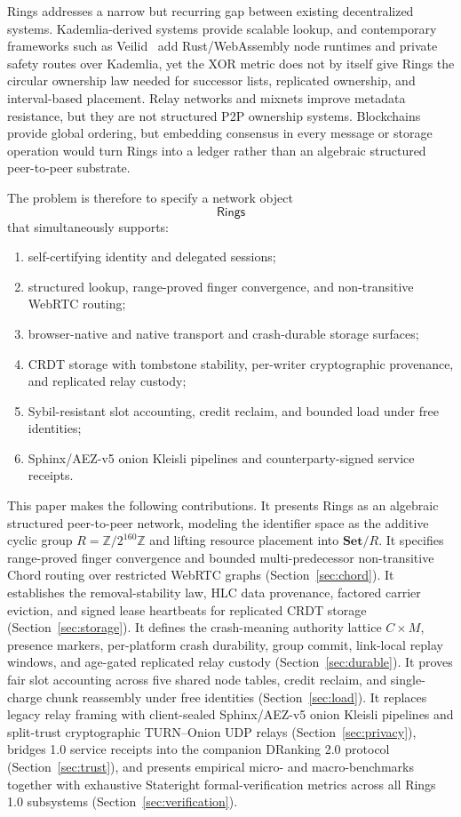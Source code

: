 \documentclass[journal]{IEEEtran}
\begin{document}
Rings addresses a narrow but recurring gap between existing decentralized
systems.  Kademlia-derived systems provide scalable lookup, and contemporary frameworks such as Veilid~\cite{Veilid2023} add Rust/WebAssembly node runtimes and private safety routes over Kademlia, yet the XOR metric
does not by itself give Rings the circular ownership law needed for successor
lists, replicated ownership, and interval-based placement.  Relay networks and
mixnets improve metadata resistance, but they are not structured P2P ownership
systems.  Blockchains provide global ordering, but embedding consensus in every
message or storage operation would turn Rings into a ledger rather than an
algebraic structured peer-to-peer substrate.

The problem is therefore to specify a network object
\[
  \mathsf{Rings}
\]
that simultaneously supports:
\begin{enumerate}[leftmargin=*,noitemsep,topsep=0pt]
\item self-certifying identity and delegated sessions;
\item structured lookup, range-proved finger convergence, and non-transitive WebRTC routing;
\item browser-native and native transport and crash-durable storage surfaces;
\item CRDT storage with tombstone stability, per-writer cryptographic provenance, and replicated relay custody;
\item Sybil-resistant slot accounting, credit reclaim, and bounded load under free identities;
\item Sphinx/AEZ-v5 onion Kleisli pipelines and counterparty-signed service receipts.
\end{enumerate}

This paper makes the following contributions.  It presents Rings as an
algebraic structured peer-to-peer network, modeling the identifier space as the
additive cyclic group \(R=\mathbb{Z}/2^{160}\mathbb{Z}\) and lifting resource
placement into \(\mathbf{Set}/R\).  It specifies range-proved finger
convergence and bounded multi-predecessor non-transitive Chord routing over
restricted WebRTC graphs (Section~\ref{sec:chord}).  It establishes the
removal-stability law, HLC data provenance, factored carrier eviction, and
signed lease heartbeats for replicated CRDT storage (Section~\ref{sec:storage}).
It defines the crash-meaning authority lattice $C\times M$, presence markers,
per-platform crash durability, group commit, link-local replay windows, and
age-gated replicated relay custody (Section~\ref{sec:durable}).  It proves
fair slot accounting across five shared node tables, credit reclaim, and
single-charge chunk reassembly under free identities (Section~\ref{sec:load}).
It replaces legacy relay framing with client-sealed Sphinx/AEZ-v5 onion Kleisli
pipelines and split-trust cryptographic TURN--Onion UDP relays (Section~\ref{sec:privacy}), bridges 1.0 service receipts into the
companion DRanking 2.0 protocol~\cite{RingsDRanking2026} (Section~\ref{sec:trust}),
and presents empirical micro- and macro-benchmarks together with exhaustive
Stateright formal-verification metrics across all Rings 1.0 subsystems
(Section~\ref{sec:verification}).
\end{document}
